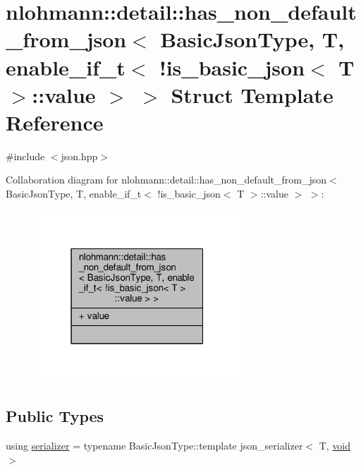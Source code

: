 \hypertarget{structnlohmann_1_1detail_1_1has__non__default__from__json_3_01BasicJsonType_00_01T_00_01enable__b7a8cd863889b54d1139b207b4233111}{}\section{nlohmann\+:\+:detail\+:\+:has\+\_\+non\+\_\+default\+\_\+from\+\_\+json$<$ Basic\+Json\+Type, T, enable\+\_\+if\+\_\+t$<$ !is\+\_\+basic\+\_\+json$<$ T $>$\+:\+:value $>$ $>$ Struct Template Reference}
\label{structnlohmann_1_1detail_1_1has__non__default__from__json_3_01BasicJsonType_00_01T_00_01enable__b7a8cd863889b54d1139b207b4233111}


{\ttfamily \#include $<$json.\+hpp$>$}



Collaboration diagram for nlohmann\+:\+:detail\+:\+:has\+\_\+non\+\_\+default\+\_\+from\+\_\+json$<$ Basic\+Json\+Type, T, enable\+\_\+if\+\_\+t$<$ !is\+\_\+basic\+\_\+json$<$ T $>$\+:\+:value $>$ $>$\+:
\nopagebreak
\begin{figure}[H]
\begin{center}
\leavevmode
\includegraphics[width=220pt]{structnlohmann_1_1detail_1_1has__non__default__from__json_3_01BasicJsonType_00_01T_00_01enable__5d44cf8fe8fc20db880cdda000bcf872}
\end{center}
\end{figure}
\subsection*{Public Types}
\begin{DoxyCompactItemize}
\item 
using \hyperlink{structnlohmann_1_1detail_1_1has__non__default__from__json_3_01BasicJsonType_00_01T_00_01enable__b7a8cd863889b54d1139b207b4233111_a4bcee5e52902d3011df08cf0233e5e10}{serializer} = typename Basic\+Json\+Type\+::template json\+\_\+serializer$<$ T, \hyperlink{namespacenlohmann_1_1detail_a59fca69799f6b9e366710cb9043aa77d}{void} $>$
\end{DoxyCompactItemize}
